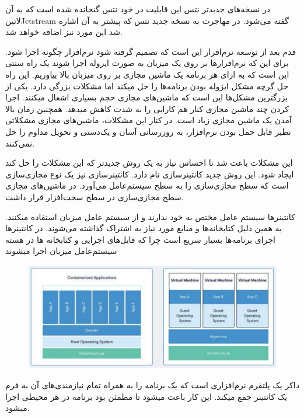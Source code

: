 \documentclass[a4]{report}
\begin{document}
در نسخه‌های جدیدتر نتس این قابلیت در خود نتس گنجانده شده است که به آن ‌لاتین{Jetstream} گفته می‌شود. در مهاجرت به نسخه جدید نتس که پیشتر به آن اشاره شد این مورد نیز اضافه خواهد شد.

قدم بعد از توسعه نرم‌افزار این است که تصمیم گرفته شود نرم‌افزار چگونه اجرا شود. برای این که نرم‌افزارها بر روی یک میزبان به صورت ایزوله اجرا شوند یک راه سنتی این است که به ازای هر برنامه یک ماشین مجازی
بر روی میزبان بالا بیاوریم. این راه حل گرچه مشکل ایزوله بودن برنامه‌ها را حل میکند اما مشکلات بزرگی دارد.
یکی از بزرگترین مشکل‌ها این است که ماشین‌های مجازی حجم بسیاری اشغال میکنند. اجرا کردن چند ماشین
مجازی کنار هم کارایی را به شدت کاهش میدهد. همچنین زمان بالا آمدن یک ماشین مجازی زیاد است. در کنار این مشکلات، ماشین‌های مجازی مشکلاتی نظیر قابل حمل بودن نرم‌افزار، به روز‌رسانی آسان و یک‌دستی و تحویل مداوم را حل نمی‌کنند.

این مشکلات باعث شد تا احساس نیاز به یک روش جدیدتر که این مشکلات را حل کند ایجاد شود. این روش جدید کانتینرسازی نام دارد. کانتینرسازی نیز یک نوع مجازی‌سازی است که سطح مجازی‌سازی را به سطح سیستم‌عامل می‌آورد. در ماشین‌های مجازی سطح مجازی‌سازی در سطح سخت‌افزار قرار داشت.

کانتینرها سیستم عامل مختص به خود ندارند و از سیستم عامل میزبان استفاده میکنند. به همین دلیل
کتابخانه‌ها و منابع مورد نیاز به اشتراک گذاشته می‌شوند. در کانتینرها اجرای برنامه‌ها بسیار سریع است چرا که
فایل‌های اجرایی و کتابخانه ها در هسته سیستم‌عامل میزبان اجرا میشوند

\begin{figure}
\centering
\includegraphics[scale=0.25]{fig/vm}
\end{figure}

داکر یک پلتفرم نرم‌افزاری است که یک برنامه را به همراه تمام نیازمندی‌های آن به فرم یک کانتینر جمع
میکند. این کار باعث میشود تا مطمئن بود برنامه در هر محیطی اجرا میشود.
\end{document}
